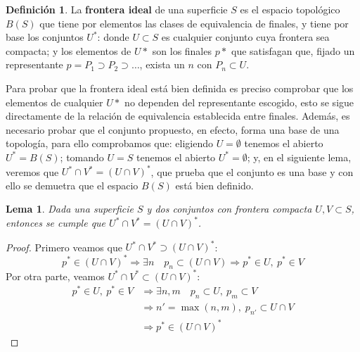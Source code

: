 \documentclass[a4paper,11pt,spanish, twoside, leqno]{tfg-uam}
\newtheorem{lema}[teor]{Lema}
\theoremstyle{definition}
\newtheorem{defin}[teor]{Definici\'on}
\begin{document}
\begin{defin}
La \textbf{frontera ideal} de una superficie $S$ es el espacio topológico $B(S)$ que tiene por elementos las clases de equivalencia de finales, y tiene por base los conjuntos $U^*$: donde $U\subset S$ es cualquier conjunto  cuya frontera sea compacta; y los elementos de $U*$ son los finales $p*$ que satisfagan que, fijado un representante $p=P_1 \supset P_2 \supset \ldots $, exista un $n$ con $P_n \subset U$.
\end{defin}
Para probar que la frontera ideal está bien definida es preciso comprobar que los elementos de cualquier $U*$ no dependen del representante escogido, esto se sigue directamente de la relación de equivalencia establecida entre finales. Además, es necesario probar que el conjunto propuesto, en efecto, forma una base de una topología, para ello comprobamos que: eligiendo $U=\emptyset$ tenemos el abierto $U^*=B(S)$; tomando $U = S$ tenemos el abierto $U^*=\emptyset$; y, en el siguiente lema, veremos que $U^* \cap V^* = (U \cap V)^*$, que prueba que el conjunto es una base y con ello se demuetra que el espacio $B(S)$ está bien definido.

\begin{lema}
Dada una superficie $S$ y dos conjuntos  con frontera compacta $U,V \subset S$, entonces se cumple que $U^*\cap V^* = (U \cap V)^* $.
\end{lema}
\begin{proof}
Primero veamos que $U^*\cap V^* \supset (U \cap V)^* $:
\[
p^* \in (U \cap V)^* \Rightarrow
\exists n \quad p_n \subset (U \cap V) \Rightarrow
p^* \in U, \: p^* \in V
\]
Por otra parte, veamos $U^*\cap V^* \subset (U \cap V)^* $:
\begin{align*}
p^* \in U, \: p^* \in V & \Rightarrow \exists n,m \quad p_n \subset U, \: p_m \subset V\\
& \Rightarrow n' = \max(n,m), \; p_{n'} \subset U \cap V\\
& \Rightarrow p^* \in (U\cap V)^*
\end{align*}
\end{proof}
\end{document}
